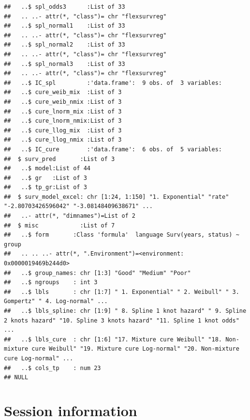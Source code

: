\documentclass[
]{article}
\begin{document}
\begin{verbatim}
##   ..$ spl_odds3      :List of 33
##   .. ..- attr(*, "class")= chr "flexsurvreg"
##   ..$ spl_normal1    :List of 33
##   .. ..- attr(*, "class")= chr "flexsurvreg"
##   ..$ spl_normal2    :List of 33
##   .. ..- attr(*, "class")= chr "flexsurvreg"
##   ..$ spl_normal3    :List of 33
##   .. ..- attr(*, "class")= chr "flexsurvreg"
##   ..$ IC_spl         :'data.frame':  9 obs. of  3 variables:
##   ..$ cure_weib_mix  :List of 3
##   ..$ cure_weib_nmix :List of 3
##   ..$ cure_lnorm_mix :List of 3
##   ..$ cure_lnorm_nmix:List of 3
##   ..$ cure_llog_mix  :List of 3
##   ..$ cure_llog_nmix :List of 3
##   ..$ IC_cure        :'data.frame':  6 obs. of  5 variables:
##  $ surv_pred       :List of 3
##   ..$ model:List of 44
##   ..$ gr   :List of 3
##   ..$ tp_gr:List of 3
##  $ surv_model_excel: chr [1:24, 1:150] "1. Exponential" "rate" "-2.80703426596042" "-3.08148409638671" ...
##   ..- attr(*, "dimnames")=List of 2
##  $ misc            :List of 7
##   ..$ form       :Class 'formula'  language Surv(years, status) ~ group
##   .. .. ..- attr(*, ".Environment")=<environment: 0x0000019469b244d0> 
##   ..$ group_names: chr [1:3] "Good" "Medium" "Poor"
##   ..$ ngroups    : int 3
##   ..$ lbls       : chr [1:7] " 1. Exponential" " 2. Weibull" " 3. Gompertz" " 4. Log-normal" ...
##   ..$ lbls_spline: chr [1:9] " 8. Spline 1 knot hazard" " 9. Spline 2 knots hazard" "10. Spline 3 knots hazard" "11. Spline 1 knot odds" ...
##   ..$ lbls_cure  : chr [1:6] "17. Mixture cure Weibull" "18. Non-mixture cure Weibull" "19. Mixture cure Log-normal" "20. Non-mixture cure Log-normal" ...
##   ..$ cols_tp    : num 23
## NULL
\end{verbatim}

\clearpage

\hypertarget{session-information}{%
\section{Session information}\label{session-information}}
\end{document}
